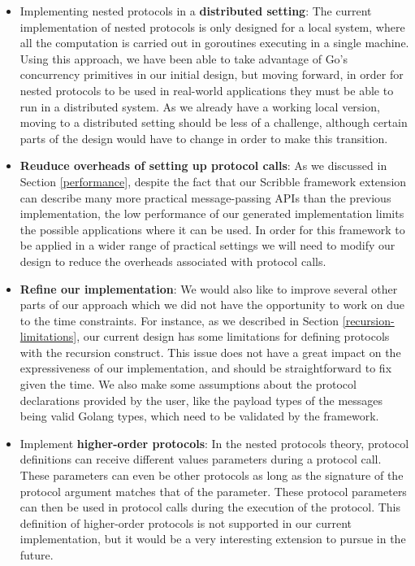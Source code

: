 \documentclass[12pt,twoside]{report}
\begin{document}
\begin{itemize}
    \item Implementing nested protocols in a \textbf{distributed setting}:
    The current implementation of nested protocols is only designed for a local system, where all the computation is carried out in goroutines executing in a single machine. Using this approach, we have been able to take advantage of Go's concurrency primitives in our initial design, but moving forward, in order for nested protocols to be used in real-world applications they must be able to run in a distributed system. As we already have a working local version, moving to a distributed setting should be less of a challenge, although certain parts of the design would have to change in order to make this transition.
    \item \textbf{Reuduce overheads of setting up protocol calls}: As we discussed in Section \ref{performance}, despite the fact that our Scribble framework extension can describe many more practical message-passing APIs than the previous implementation, the low performance of our generated implementation limits the possible applications where it can be used. In order for this framework to be applied in a wider range of practical settings we will need to modify our design to reduce the overheads associated with protocol calls.
    \item \textbf{Refine our implementation}: We would also like to improve several other parts of our approach which we did not have the opportunity to work on due to the time constraints. For instance, as we described in Section \ref{recursion-limitations}, our current design has some limitations for defining protocols with the recursion construct. This issue does not have a great impact on the expressiveness of our implementation, and should be straightforward to fix given the time. We also make some assumptions about the protocol declarations provided by the user, like the payload types of the messages being valid Golang types, which need to be validated by the framework.
    \item Implement \textbf{higher-order protocols}: In the nested protocols theory, protocol definitions can receive different values parameters during a protocol call. These parameters can even be other protocols as long as the signature of the protocol argument matches that of the parameter. These protocol parameters can then be used in protocol calls during the execution of the protocol. This definition of higher-order protocols is not supported in our current implementation, but it would be a very interesting extension to pursue in the future.
\end{itemize}
\end{document}
